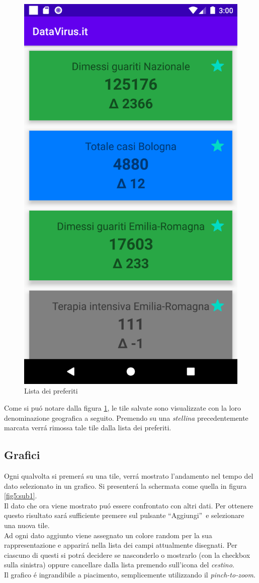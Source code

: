 \documentclass{article}
\newcommand{\quotes}[1]{``#1''}
\begin{document}
    \begin{figure}[h]
        \centering
        \includegraphics[width=.5\linewidth]{preferences.png}
        \caption{Lista dei preferiti}
        \label{fig4}
    \end{figure}

    Come si puó notare dalla figura \ref{fig4}, le tile salvate sono visualizzate con la loro denominazione geografica a seguito.
    Premendo su una \emph{stellina} precedentemente marcata verrá rimossa tale tile dalla lista dei preferiti.

    \subsection{Grafici}
    Ogni qualvolta si premerá su una tile, verrá mostrato l'andamento nel tempo del dato selezionato in un grafico.
    Si presenterá la schermata come quella in figura \ref{fig5:sub1}.
    \\
    Il dato che ora viene mostrato puó essere confrontato con altri dati. Per ottenere questo risultato sará sufficiente premere sul pulsante \quotes{Aggiungi} e selezionare una nuova tile.
    \\
    Ad ogni dato aggiunto viene assegnato un colore random per la sua rappresentazione e apparirá nella lista dei campi attualmente disegnati. 
    Per ciascuno di questi si potrá decidere se nasconderlo o mostrarlo (con la checkbox sulla sinistra) oppure cancellare dalla lista premendo sull'icona del \emph{cestino}.
    \\
    Il grafico é ingrandibile a piacimento, semplicemente utilizzando il \emph{pinch-to-zoom}.
\end{document}
